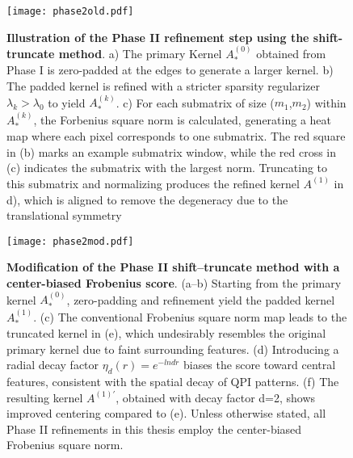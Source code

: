 \begin{figure}
	\texttt{[image: phase2old.pdf]}
	\centering
	\caption[\textbf{Illustration of the Phase II refinement step using the shift-truncate method}]{\textbf{Illustration of the Phase II refinement step using the shift-truncate method}. a) The primary Kernel $A^{(0)}_*$ obtained from Phase I is zero-padded at the edges to generate a larger kernel. b) The padded kernel is refined with a stricter sparsity regularizer $\lambda_k > \lambda_0$ to yield $A_*^{(k)}$. c) For each submatrix of size ($m_1$,$m_2$) within $A_*^{(k)}$, the Forbenius square norm is calculated, generating a heat map where each pixel corresponds to one submatrix. The red square in (b) marks an example submatrix window, while the red cross in (c) indicates the submatrix with the largest norm. Truncating to this submatrix and normalizing produces the refined kernel $A^{(1)}$ in d), which is aligned to remove the degeneracy due to the translational symmetry}
	\label{fig:ch6_phase2}
\end{figure}


\begin{figure}
	\texttt{[image: phase2mod.pdf]}
	\centering
	\caption[\textbf{Modification of the Phase II shift–truncate method with a center-biased Frobenius score}]{\textbf{Modification of the Phase II shift–truncate method with a center-biased Frobenius score}. (a–b) Starting from the primary kernel $A^{(0)}_*$, zero-padding and refinement yield the padded kernel $A_*^{(1)}$. (c) The conventional Frobenius square norm map leads to the truncated kernel in (e), which undesirably resembles the original primary kernel due to faint surrounding features. (d) Introducing a radial decay factor $\eta_d(r) = e^{-lnd\dot{r}}$ biases the score toward central features, consistent with the spatial decay of QPI patterns. (f) The resulting kernel $A^{(1)'}$, obtained with decay factor d=2, shows improved centering compared to (e). Unless otherwise stated, all Phase II refinements in this thesis employ the center-biased Frobenius square norm.}
	\label{fig:ch6_phase2mod}
\end{figure}


